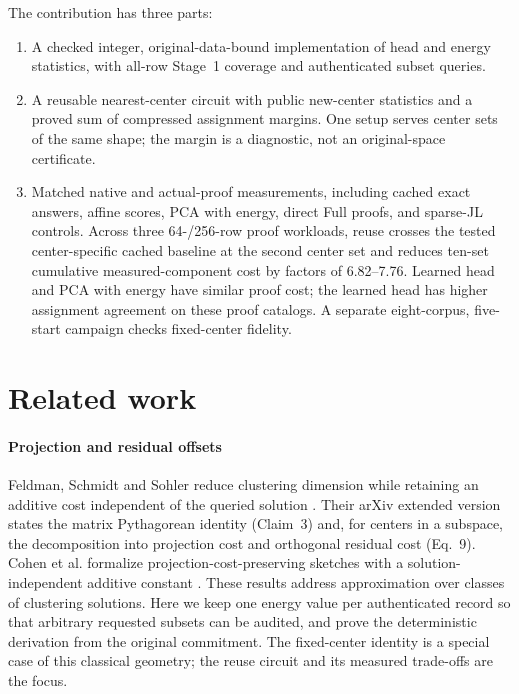 The contribution has three parts:
\begin{enumerate}[leftmargin=*]
\item A checked integer, original-data-bound implementation of head and energy statistics, with all-row Stage~1 coverage and authenticated subset queries.
\item A reusable nearest-center circuit with public new-center statistics and a proved sum of compressed assignment margins. One setup serves center sets of the same shape; the margin is a diagnostic, not an original-space certificate.
\item Matched native and actual-proof measurements, including cached exact answers, affine scores, PCA with energy, direct Full proofs, and sparse-JL controls. Across three 64-/256-row proof workloads, reuse crosses the tested center-specific cached baseline at the second center set and reduces ten-set cumulative measured-component cost by factors of 6.82--7.76. Learned head and PCA with energy have similar proof cost; the learned head has higher assignment agreement on these proof catalogs. A separate eight-corpus, five-start campaign checks fixed-center fidelity.
\end{enumerate}

\section{Related work}\label{sec:related}
\paragraph{Projection and residual offsets}
Feldman, Schmidt and Sohler reduce clustering dimension while retaining an additive cost independent of the queried solution \cite{feldman2013tiny,feldman2020tiny}. Their arXiv extended version states the matrix Pythagorean identity (Claim~3) and, for centers in a subspace, the decomposition into projection cost and orthogonal residual cost (Eq.~9). Cohen et al. formalize projection-cost-preserving sketches with a solution-independent additive constant \cite{cohen2015dimensionality}. These results address approximation over classes of clustering solutions. Here we keep one energy value per authenticated record so that arbitrary requested subsets can be audited, and prove the deterministic derivation from the original commitment. The fixed-center identity is a special case of this classical geometry; the reuse circuit and its measured trade-offs are the focus.

